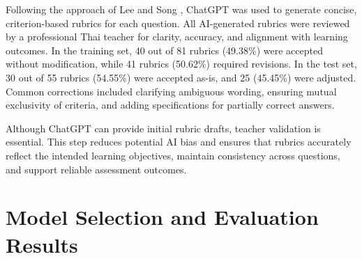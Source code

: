 Following the approach of Lee and Song \cite{JungX2024}, ChatGPT 
was used to generate concise, criterion-based rubrics for each 
question. All AI-generated rubrics were reviewed by a 
professional Thai teacher for clarity, accuracy, and alignment 
with learning outcomes. In the training set, 40 out of 81 
rubrics (49.38\%) were accepted without modification, while 41 
rubrics (50.62\%) required revisions. In the test set, 30 out 
of 55 rubrics (54.55\%) were accepted as-is, and 25 (45.45\%) 
were adjusted. Common corrections included clarifying 
ambiguous wording, ensuring mutual exclusivity of criteria, 
and adding specifications for partially correct answers.

Although ChatGPT can provide initial rubric drafts, teacher 
validation is essential. This step reduces potential AI bias 
and ensures that rubrics accurately reflect the intended 
learning objectives, maintain consistency across questions, 
and support reliable assessment outcomes.


\section{Model Selection and Evaluation Results}




